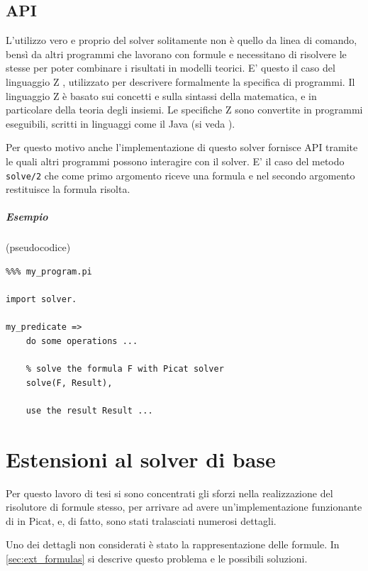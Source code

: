 \documentclass[12pt,a4paper,openright]{book} %
\begin{document}
\section{API}
\label{sec:use_api}

L'utilizzo vero e proprio del solver solitamente non è quello da linea
di comando, bensì da altri programmi che lavorano con formule e
necessitano di risolvere le stesse per poter combinare i risultati in
modelli teorici. E' questo il caso del linguaggio Z \cite{Cristia16},
utilizzato per descrivere formalmente la specifica di programmi. Il
linguaggio Z è basato sui concetti e sulla sintassi della matematica,
e in particolare della teoria degli insiemi. Le specifiche Z sono
convertite in programmi eseguibili, scritti in linguaggi come il Java
(si veda \cite{DeSantis17}).

Per questo motivo anche l'implementazione di questo solver fornisce
API tramite le quali altri programmi possono interagire con il
solver. E' il caso del metodo \verb|solve/2| che come primo argomento
riceve una formula e nel secondo argomento restituisce la formula
risolta.

\paragraph{Esempio} (pseudocodice)
\begin{verbatim}
%%% my_program.pi

import solver.

my_predicate =>
    do some operations ...

    % solve the formula F with Picat solver
    solve(F, Result),

    use the result Result ...
\end{verbatim}

\chapter{Estensioni al solver di base}
\label{ch:ext}

\minitoc

Per questo lavoro di tesi si sono concentrati gli sforzi nella
realizzazione del risolutore di formule stesso, per arrivare ad avere
un'implementazione funzionante di \lset{} in Picat, e, di fatto, sono
stati tralasciati numerosi dettagli.

Uno dei dettagli non considerati è stato la rappresentazione delle
formule. In \ref{sec:ext_formulas} si descrive questo problema e le
possibili soluzioni.
\end{document}
